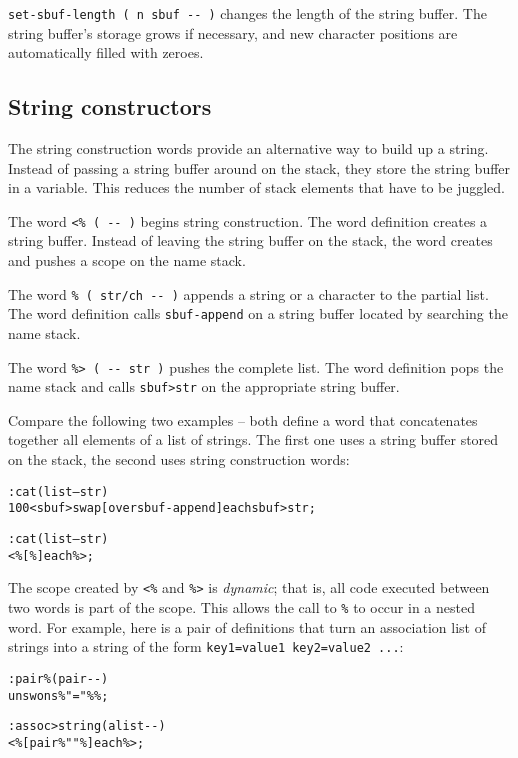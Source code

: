 \documentclass[english]{article}
\begin{document}
\texttt{set-sbuf-length ( n sbuf -{}- )} changes the length of the
string buffer. The string buffer's storage grows if necessary, and
new character positions are automatically filled with zeroes.


\subsection{String constructors}

The string construction words provide an alternative way to build up a string. Instead of passing a string buffer around on the stack, they store the string buffer in a variable. This reduces the number
of stack elements that have to be juggled.

The word \texttt{<\% ( -{}- )} begins string construction. The word
definition creates a string buffer. Instead of leaving the string
buffer on the stack, the word creates and pushes a scope on the name
stack.

The word \texttt{\% ( str/ch -{}- )} appends a string or a character
to the partial list. The word definition calls \texttt{sbuf-append}
on a string buffer located by searching the name stack.

The word \texttt{\%> ( -{}- str )} pushes the complete list. The word
definition pops the name stack and calls \texttt{sbuf>str} on the
appropriate string buffer.

Compare the following two examples -- both define a word that concatenates together all elements of a list of strings. The first one uses a string buffer stored on the stack, the second uses string construction words:

\begin{alltt}
: cat ( list -- str )
    100 <sbuf> swap {[} over sbuf-append {]} each sbuf>str ;

: cat ( list -- str )
    <\% {[} \% {]} each \%> ;
\end{alltt}

The scope created by \texttt{<\%} and \texttt{\%>} is \emph{dynamic}; that is, all code executed between two words is part of the scope. This allows the call to \texttt{\%} to occur in a nested word. For example, here is a pair of definitions that turn an association list of strings into a string of the form \texttt{key1=value1 key2=value2 ...}:

\begin{alltt}
: pair\% ( pair -{}- )
    unswons \% "=" \% \% ;

: assoc>string ( alist -{}- )
    <\% [ pair\% " " \% ] each \%> ;
\end{alltt}
\end{document}
